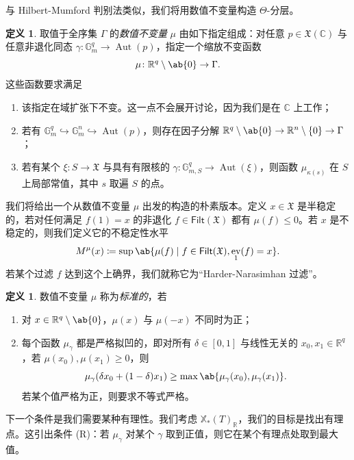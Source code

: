 \documentclass{amsart}
\theoremstyle{definition}
\newtheorem{defn}[thm]{定义}
\theoremstyle{remark}
\theoremstyle{plain}
\theoremstyle{definition}
\theoremstyle{remark}
\newcommand{\G}{\mathbb{G}}
\newcommand{\R}{\mathbb{R}}
\newcommand{\C}{\mathbb{C}}
\newcommand{\mf}[1]{\mathfrak{#1}}
\newcommand{\ms}[1]{\mathsf{#1}}
\newcommand{\1}{\mathbf{1}}
\newcommand{\2}{\mathbf{2}}
\newcommand{\3}{\mathbf{3}}
\DeclareMathOperator{\Aut}{Aut}
\DeclareMathOperator{\ev}{ev}
\begin{document}
与 Hilbert-Mumford 判别法类似，我们将用数值不变量构造 \(\Theta\)-分层。
\begin{defn}
    取值于全序集 \(\Gamma\) 的\textit{数值不变量} \(\mu\) 由如下指定组成：对任意 \(p \in \mf{X}(\C)\) 与任意非退化同态 \(\gamma \colon \G_m^q \to \Aut(p)\)，指定一个缩放不变函数
    \[ \mu \colon \R^q \setminus \ab\{0\} \to \Gamma. \]
    这些函数要求满足
    \begin{enumerate}
        \item 该指定在域扩张下不变。这一点不会展开讨论，因为我们是在 \(\C\) 上工作；
        \item 若有 \(\G_m^q \hookrightarrow \G_m^n \hookrightarrow \Aut(p)\)，则存在因子分解 \(\R^q \setminus \ab\{0\} \to \R^n \setminus \{0\} \to \Gamma\)；
        \item 若有某个 \(\xi \colon S \to \mf{X}\) 与具有有限核的 \(\gamma \colon \G_{m, S}^q \to \Aut(\xi)\)，则函数 \(\mu_{\kappa(s)}\) 在 \(S\) 上局部常值，其中 \(s\) 取遍 \(S\) 的点。
    \end{enumerate}
\end{defn}

我们将给出一个从数值不变量 \(\mu\) 出发的构造的朴素版本。定义 \(x \in \mf{X}\) 是半稳定的，若对任何满足 \(f(1) = x\) 的非退化 \(f \in \ms{Filt}(\mf{X})\) 都有 \(\mu(f) \leq 0\)。若 \(x\) 是不稳定的，则我们定义它的不稳定性水平
\[ M^{\mu}(x) \coloneqq \sup \ab\{ \mu(f) \mid f \in \ms{Filt}(\mf{X}), \ev_1(f) = x\}. \]
若某个过滤 \(f\) 达到这个上确界，我们就称它为``Harder-Narasimhan 过滤''。

\begin{defn}
    数值不变量 \(\mu\) 称为\textit{标准的}，若
    \begin{enumerate}
        \item 对 \(x \in \R^q \setminus \ab\{0\}\)，\(\mu(x)\) 与 \(\mu(-x)\) 不同时为正；
        \item 每个函数 \(\mu_{\gamma}\) 都是严格拟凹的，即对所有 \(\delta \in [0,1]\) 与线性无关的 \(x_0, x_1 \in \R^q\)，若 \(\mu(x_0), \mu(x_1) \geq 0\)，则
            \[\mu_{\gamma}(\delta x_0 + (1-\delta)x_1) \geq \max\ab\{\mu_{\gamma}(x_0), \mu_{\gamma}(x_1)\}.\] 若某个值严格为正，则要求不等式严格。
    \end{enumerate}
\end{defn}

下一个条件是我们需要某种有理性。我们考虑 \(\mathbb{X}_*(T)_{\R}\)，我们的目标是找出有理点。这引出条件 (R)：若 \(\mu_{\gamma}\) 对某个 \(\gamma\) 取到正值，则它在某个有理点处取到最大值。
\end{document}
